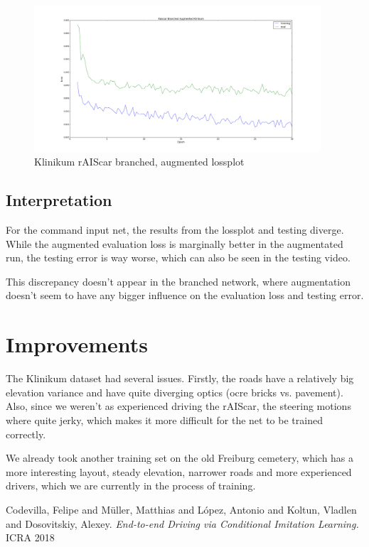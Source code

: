 \documentclass[a4paper]{article}
\begin{document}
\begin{figure}[H]
	\centering
	\includegraphics[width=0.95\textwidth]{figures/raiscar_branched_aug_klinikum_lossplot}
	\caption{Klinikum rAIScar branched, augmented lossplot}
	\label{fig:klinikum_augmented_branched_loss}
\end{figure}

\subsection{Interpretation}
For the command input net, the results from the lossplot and testing diverge.
While the augmented evaluation loss is marginally better in the augmentated run,
the testing error is way worse, which can also be seen in the testing video.

This discrepancy doesn't appear in the branched network, where augmentation
doesn't seem to have any bigger influence on the evaluation loss and testing
error.

\section{Improvements}
The Klinikum dataset had several issues. Firstly, the roads have a relatively
big elevation variance and have quite diverging optics (ocre bricks vs.
pavement). Also, since we weren't as experienced driving the rAIScar, the
steering motions where quite jerky, which makes it more difficult for the net to
be trained correctly.

We already took another training set on the old Freiburg cemetery, which has a
more interesting layout, steady elevation, narrower roads and more experienced
drivers, which we are currently in the process of training.


\begin{thebibliography}{9}
Codevilla, Felipe and Müller, Matthias and López, Antonio and Koltun, Vladlen
and Dosovitskiy, Alexey.
\textit{End-to-end Driving via Conditional Imitation Learning.}
ICRA 2018
\end{thebibliography}
\end{document}
